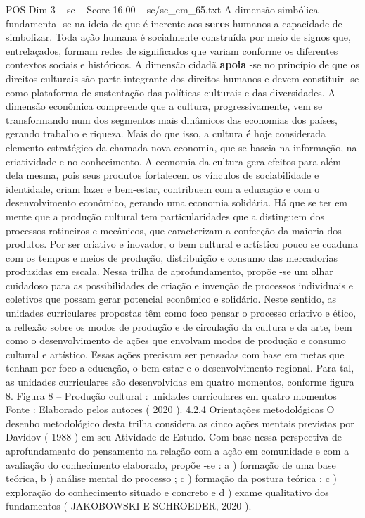 \begin{textsample}{POS Dim 3 – sc – Score 16.00 – sc/sc\_em\_65.txt}
A dimensão simbólica fundamenta -se na ideia de que é inerente aos \textbf{seres} humanos a capacidade de simbolizar.
Toda ação humana é socialmente construída por meio de signos que, entrelaçados, formam redes de significados que variam conforme os diferentes contextos sociais e históricos.
A dimensão cidadã \textbf{apoia} -se no princípio de que os direitos culturais são parte integrante dos direitos humanos e devem constituir -se como plataforma de sustentação das políticas culturais e das diversidades.
A dimensão econômica compreende que a cultura, progressivamente, vem se transformando num dos segmentos mais dinâmicos das economias dos países, gerando trabalho e riqueza.
Mais do que isso, a cultura é hoje considerada elemento estratégico da chamada nova economia, que se baseia na informação, na criatividade e no conhecimento.
A economia da cultura gera efeitos para além dela mesma, pois seus produtos fortalecem os vínculos de sociabilidade e identidade, criam lazer e bem-estar, contribuem com a educação e com o desenvolvimento econômico, gerando uma economia solidária.
Há que se ter em mente que a produção cultural tem particularidades que a distinguem dos processos rotineiros e mecânicos, que caracterizam a confecção da maioria dos produtos.
Por ser criativo e inovador, o bem cultural e artístico pouco se coaduna com os tempos e meios de produção, distribuição e consumo das mercadorias produzidas em escala.
Nessa trilha de aprofundamento, propõe -se um olhar cuidadoso para as possibilidades de criação e invenção de processos individuais e coletivos que possam gerar potencial econômico e solidário.
Neste sentido, as unidades curriculares propostas têm como foco pensar o processo criativo e ético, a reflexão sobre os modos de produção e de circulação da cultura e da arte, bem como o desenvolvimento de ações que envolvam modos de produção e consumo cultural e artístico.
Essas ações precisam ser pensadas com base em metas que tenham por foco a educação, o bem-estar e o desenvolvimento regional.
Para tal, as unidades curriculares são desenvolvidas em quatro momentos, conforme figura 8.
Figura 8 – Produção cultural : unidades curriculares em quatro momentos Fonte : Elaborado pelos autores ( 2020 ). 4.2.4 Orientações metodológicas O desenho metodológico desta trilha considera as cinco ações mentais previstas por Davidov ( 1988 ) em seu Atividade de Estudo.
Com base nessa perspectiva de aprofundamento do pensamento na relação com a ação em comunidade e com a avaliação do conhecimento elaborado, propõe -se : a ) formação de uma base teórica, b ) análise mental do processo ; c ) formação da postura teórica ; c ) exploração do conhecimento situado e concreto e d ) exame qualitativo dos fundamentos ( JAKOBOWSKI E SCHROEDER, 2020 ).

\end{textsample}
